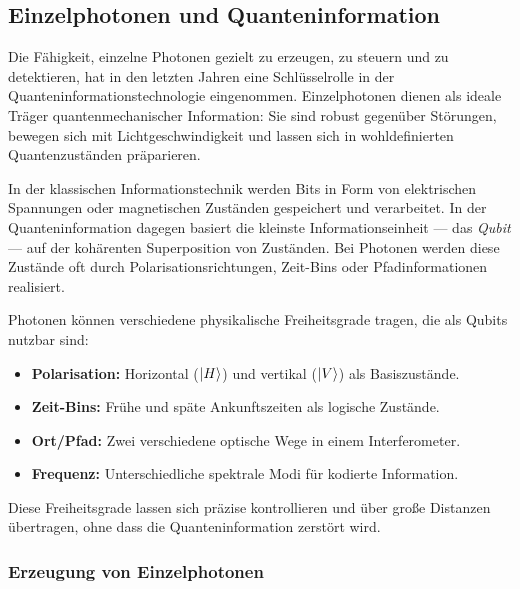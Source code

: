 \subsection{Einzelphotonen und Quanteninformation}

Die Fähigkeit, einzelne Photonen gezielt zu erzeugen, zu steuern und zu detektieren, hat in den letzten Jahren eine Schlüsselrolle in der Quanteninformationstechnologie eingenommen. Einzelphotonen dienen als ideale Träger quantenmechanischer Information: Sie sind robust gegenüber Störungen, bewegen sich mit Lichtgeschwindigkeit und lassen sich in wohldefinierten Quantenzuständen präparieren.

In der klassischen Informationstechnik werden Bits in Form von elektrischen Spannungen oder magnetischen Zuständen gespeichert und verarbeitet. In der Quanteninformation dagegen basiert die kleinste Informationseinheit — das \emph{Qubit} — auf der kohärenten Superposition von Zuständen. Bei Photonen werden diese Zustände oft durch Polarisationsrichtungen, Zeit-Bins oder Pfadinformationen realisiert.
\vspace{1em}
\begin{tcolorbox}[physikbox, title=Was macht ein Photon zum Informationsträger? \label{box:photon_information}]
	\small
	Photonen können verschiedene physikalische Freiheitsgrade tragen, die als Qubits nutzbar sind:
	\begin{itemize}
		\item \textbf{Polarisation:} Horizontal ($\ket{H}$) und vertikal ($\ket{V}$) als Basiszustände.
		\item \textbf{Zeit-Bins:} Frühe und späte Ankunftszeiten als logische Zustände.
		\item \textbf{Ort/Pfad:} Zwei verschiedene optische Wege in einem Interferometer.
		\item \textbf{Frequenz:} Unterschiedliche spektrale Modi für kodierte Information.
	\end{itemize}
	Diese Freiheitsgrade lassen sich präzise kontrollieren und über große Distanzen übertragen, ohne dass die Quanteninformation zerstört wird.
\end{tcolorbox}

\subsubsection{Erzeugung von Einzelphotonen}

